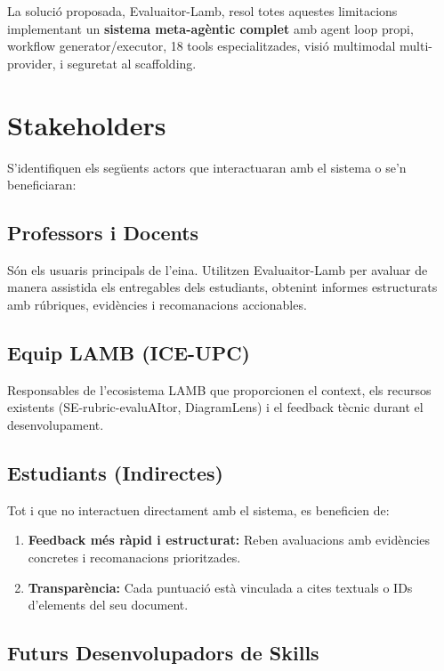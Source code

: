\documentclass[12pt,a4paper,twoside]{report}
\begin{document}
La soluci\'o proposada, Evaluaitor-Lamb, resol totes aquestes limitacions implementant un \textbf{sistema meta-ag\`entic complet} amb agent loop propi, workflow generator/executor, 18 tools especialitzades, visi\'o multimodal multi-provider, i seguretat al scaffolding.

\section{Stakeholders}
\label{sec:stakeholders}

S'identifiquen els seg\"uents actors que interactuaran amb el sistema o se'n beneficiaran:

\subsection{Professors i Docents}
\label{subsec:professors}

S\'on els usuaris principals de l'eina. Utilitzen Evaluaitor-Lamb per avaluar de manera assistida els entregables dels estudiants, obtenint informes estructurats amb r\'ubriques, evid\`encies i recomanacions accionables.

\subsection{Equip LAMB (ICE-UPC)}
\label{subsec:equip-lamb}

Responsables de l'ecosistema LAMB que proporcionen el context, els recursos existents (SE-rubric-evaluAItor, DiagramLens) i el feedback t\`ecnic durant el desenvolupament.

\subsection{Estudiants (Indirectes)}
\label{subsec:estudiants}

Tot i que no interactuen directament amb el sistema, es beneficien de:

\begin{enumerate}
    \item \textbf{Feedback m\'es r\`apid i estructurat:} Reben avaluacions amb evid\`encies concretes i recomanacions prioritzades.
    \item \textbf{Transpar\`encia:} Cada puntuaci\'o est\`a vinculada a cites textuals o IDs d'elements del seu document.
\end{enumerate}

\subsection{Futurs Desenvolupadors de Skills}
\label{subsec:futurs-devs}
\end{document}

